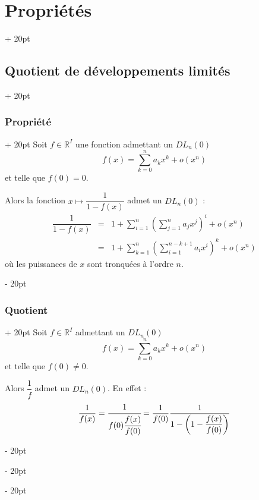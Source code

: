 \documentclass[a4paper, 12pt, twoside]{article}
\newcommand{\R}{\mathbb{R}} %
\newcommand{\lr}[1]{\left( #1 \right)}
\newcommand{\ind}[1][20pt]{\advance\leftskip + #1}
\newcommand{\deind}[1][20pt]{\advance\leftskip - #1}
\newenvironment{indt}[2][20pt]{#2 \par \ind[#1]}{\par \deind} %
\begin{document}
\begin{indt}{\section{Propriétés}}
        \vspace{12pt}
        
        \begin{indt}{\subsection{Quotient de développements limités}}
            
            \begin{indt}{\subsubsection{Propriété}}
                \label{2.5.1}
                Soit $f \in \R^I$ une fonction admettant un $DL_n(0)$
                    \[ f(x) = \sum_{k = 0}^n a_k x^k + o(x^n) \]
                et telle que $f(0) = 0$.
                
                \vspace{6pt}
                
                Alors la fonction $x \longmapsto \dfrac{1}{1 - f(x)}$ admet un $DL_n(0)$ :
                    \[
                        \begin{array}{rcl}
                            \dfrac{1}{1 - f(x)}
                            &=& \displaystyle 1 + \sum_{i = 1}^n \lr{\sum_{j = 1}^n a_j x^j}^i + o(x^n)
                            \\
                            &=& \displaystyle 1 + \sum_{k = 1}^n \lr{\sum_{i = 1}^{n - k + 1} a_i x^i}^k + o(x^n)
                        \end{array}
                    \]
                où les puissances de $x$ sont tronquées à l'ordre $n$.
            \end{indt}
            
            \vspace{12pt}
            
            \begin{indt}{\subsubsection{Quotient}}
                Soit $f \in \R^I$ admettant un $DL_n(0)$
                    \[ f(x) = \sum_{k = 0}^n a_k x^k + o(x^n) \]
                et telle que $f(0) \neq 0$.
                
                Alors $\dfrac 1 f$ admet un $DL_n(0)$. En effet :
                    \[
                        \dfrac{1}{f(x)}
                        = \cfrac{1}{f(0) \cfrac{f(x)}{f(0)}}
                        = \dfrac{1}{f(0)} \dfrac{1}{1 - \lr{1 - \dfrac{f(x)}{f(0)}}}
                    \]
                

\end{indt}
\end{indt}
\end{indt}
\end{document}
